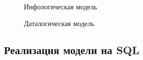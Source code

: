 \begin{figure}[ht]
  \centering
  \resizebox{0.9\textwidth}{!}{
  
  }
  \caption{Инфологическая модель}
\end{figure}


\clearpage
\begin{figure}[ht]
  \centering
    \resizebox{0.9\textwidth}{!}{
  
  }
  \caption{Даталогическая модель}
\end{figure}

\subsection{Реализация модели на SQL}

\inputminted[breaklines]{SQL}{../scheme.sql}
